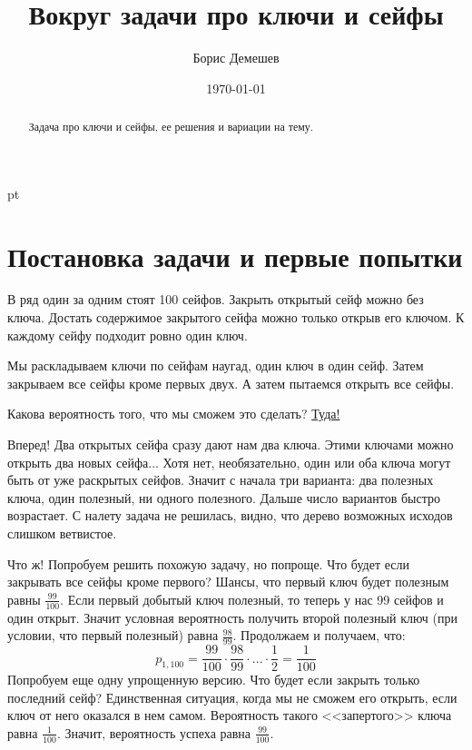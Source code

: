 \documentclass[pdftex,12pt,a4paper]{article}
\title{Вокруг задачи про ключи и сейфы}
\author{Борис Демешев}
\date{\today}
\begin{document}
\maketitle

 pt %



\begin{abstract}
Задача про ключи и сейфы, ее решения и вариации на тему.
\end{abstract}



\section{Постановка задачи и первые попытки}
В ряд один за одним стоят 100 сейфов. Закрыть открытый сейф можно без ключа. Достать содержимое закрытого сейфа можно только открыв его ключом. К каждому сейфу подходит ровно один ключ. 

Мы раскладываем ключи по сейфам наугад, один ключ в один сейф. Затем закрываем все сейфы кроме первых двух. А затем пытаемся открыть все сейфы.

Какова вероятность того, что мы сможем это сделать? \hyperref[lojniiseif]{Туда!}

Вперед! Два открытых сейфа сразу дают нам два ключа. Этими ключами можно открыть два новых сейфа... Хотя нет, необязательно, один или оба ключа могут быть от уже раскрытых сейфов. Значит с начала три варианта: два полезных ключа, один полезный, ни одного полезного. Дальше число вариантов быстро возрастает. С налету задача не решилась, видно, что дерево возможных исходов слишком ветвистое. \cite{aops:keys}


Что ж! Попробуем решить похожую задачу, но попроще. Что будет если закрывать все сейфы кроме первого? Шансы, что первый ключ будет полезным равны $\frac{99}{100}$. Если первый добытый ключ полезный, то теперь у нас 99 сейфов и один открыт. Значит условная вероятность получить второй полезный ключ (при условии, что первый полезный) равна $\frac{98}{99}$. Продолжаем и получаем, что:
$$ 
p_{1,100}=\frac{99}{100}\cdot\frac{98}{99}\cdot...\cdot\frac{1}{2}=\frac{1}{100}
$$
Попробуем еще одну упрощенную версию. Что будет если закрыть только последний сейф? Единственная ситуация, когда мы не сможем его открыть, если ключ от него оказался в нем самом. Вероятность такого <<запертого>> ключа равна $\frac{1}{100}$. Значит, вероятность успеха равна $\frac{99}{100}$.
\end{document}
